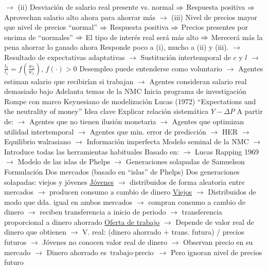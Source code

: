 \documentclass{nuevotema}
\begin{document}
\begin{esquemal}
				\4[] $\to$ (ii) Desviación de salario real presente vs. normal
				\4[] $\then$ Respuesta positiva
				\4[] $\then$ Aprovechan salario alto ahora para ahorrar más
				\4[] $\to$ (iii) Nivel de precios mayor que nivel de precios ``normal''
				\4[] $\then$ Respuesta positiva
				\4[] $\then$ Precios presentes por encima de ``normales''
				\4[] $\then$ El tipo de interés real será más alto
				\4[] $\then$ Merecerá más la pena ahorrar lo ganado ahora
				\4[] Responde poco a (i), mucho a (ii) y (iii).
				\4[] $\to$ Resultado de expectativas adaptativas
				\4[] $\to$ Sustitución intertemporal de $c$ y $l$
				\4[] $\to$ $\frac{l_2}{l_1} = f(\frac{w_2}{w_1})$, $f(\cdot) > 0$
				\4[] Desempleo puede entenderse como voluntario
				\4[] $\to$ Agentes estiman salario que recibirían si trabajan
				\4[] $\to$ Agentes consideran salario real demasiado bajo
				\4[$\then$] Adelanta temas de la NMC
				\4[$\then$] Inicia programa de investigación
				\4[$\then$] Rompe con marco Keynesiano de modelización
			\3 Lucas (1972)
				\4 ``Expectations and the neutrality of money''
				\4 Idea clave
				\4[] Explicar relación sistemática $Y-\Delta P$
				\4[] A partir de:
				\4[] $\to$ Agentes que no tienen ilusión monetaria
				\4[] $\to$ Agentes que optimizan utilidad intertemporal
				\4[] $\to$ Agentes que min. error de predicción $\to$ HER
				\4[] $\to$ Equilibrio walrasiano
				\4[] $\to$ Información imperfecta
				\4[] Modelo seminal de la NMC
				\4[] $\to$ Introduce todas las herramientas habituales
				\4[] Basado en:
				\4[] $\to$ Lucas Rapping 1969
				\4[] $\to$ Modelo de las islas de Phelps
				\4[] $\to$ Generaciones solapadas de Samuelson
				\4 Formulación
				\4[] Dos mercados (basado en ``islas'' de Phelps)
				\4[] Dos generaciones solapadas: viejos y jóvenes
				\4[] \underline{Jóvenes}
				\4[] $\to$ distribuidos de forma aleatoria entre mercados
				\4[] $\to$ producen consumo a cambio de dinero
				\4[] \underline{Viejos}
				\4[] $\to$ Distribuidos de modo que dda. igual en ambos mercados
				\4[] $\to$ compran consumo a cambio de dinero
				\4[] $\to$ reciben transferencia a inicio de periodo
				\4[] $\to$ transferencia proporcional a dinero ahorrado
				\4[] \underline{Oferta de trabajo}
				\4[] $\to$ Depende de valor real de dinero que obtienen
				\4[] $\to$ V. real: (dinero ahorrado + trans. futura) / precios futuros
				\4[] $\to$ Jóvenes no conocen valor real de dinero
				\4[] $\to$ Observan precio en su mercado
				\4[] $\to$ Dinero ahorrado es $\text{trabajo} \cdot \text{precio}$
				\4[] $\to$ Pero ignoran nivel de precios futuro

\end{esquemal}
\end{document}

